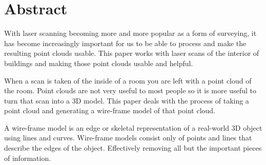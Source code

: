 \chapter*{Abstract}


	With laser scanning becoming more and more popular as a form of surveying, it has become increasingly important for us to be able to process and make the resulting point clouds usable. This paper works with laser scans of the interior of buildings and making those point clouds usable and helpful.
	
	When a scan is taken of the inside of a room you are left with a point cloud of the room. Point clouds are not very useful to most people so it is more useful to turn that scan into a 3D model. This paper deals with the process of taking a point cloud and generating a wire-frame model of that point cloud.
	
	A wire-frame model is an edge or skeletal representation of a real-world 3D object using lines and curves. Wire-frame models consist only of points and lines that describe the edges of the object. Effectively removing all but the important pieces of information.
